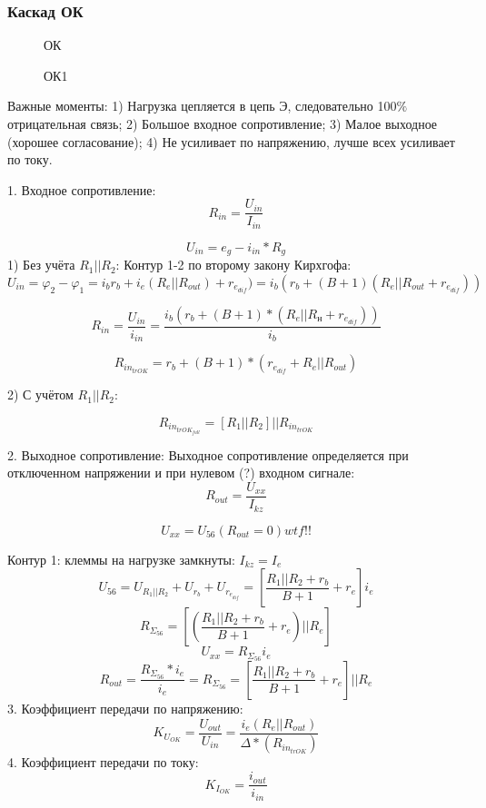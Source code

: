 \subsubsection{Каскад ОК}

\begin{center}
\begin{figure}[h!]
\caption{ОК}
\end{figure}
\end{center}

\begin{center}
\begin{figure}[h!]
\caption{ОК1}
\end{figure}
\end{center}

Важные моменты:
1) Нагрузка цепляется в цепь Э, следовательно 100$\%$ отрицательная связь;
2) Большое входное сопротивление;
3) Малое выходное (хорошее согласование);
4) Не усиливает по напряжению, лучше всех усиливает по току.

1. Входное сопротивление:
$$
R_{in} = \frac{U_{in}}{I_{in}}
$$

$$
U_{in} = e_{g}-i_{in}*R_g
$$
1) Без учёта $R_{1}||R_{2}$:
Контур 1-2 по второму закону Кирхгофа:
$$
U_{in}=\varphi_2 - \varphi_1 = i_br_b + i_e(R_e||R_{out}) + r_{e_{dif}}) = i_{b}(r_{b} + (B+1)(R_{e}||R_{out}+r_{e_{dif}}))
$$

$$
R_{in}=\frac{U_{in}}{i_{in}}=\frac{i_{b}(r_{b} + (B+1)*(R_{e}||R_{н}+r_{e_{dif}}))}{i_{b}}
$$

$$
R_{in_{trOK}}= r_{b} + (B+1)*(r_{e_{dif}}+R_{e}||R_{out})
$$

2) С учётом $R_{1}||R_{2}$:

$$
R_{in_{trOK_{full}}}= [R_{1}||R_{2}]||R_{in_{trOK}}
$$

2. Выходное сопротивление:
Выходное сопротивление определяется при отключенном напряжении и при нулевом (?) входном сигнале:
$$
R_{out}=\frac{U_{xx}}{I_{kz}}
$$

$$
U_{xx}=U_{56}(R_{out}=0) wtf!!
$$

Контур 1: клеммы на нагрузке замкнуты: $ I_{kz}=I_{e} $
$$
U_{56}=U_{R_{1}||R_{2}}+U_{r_{b}}+U_{r_{e_{dif}}} = \left[ \frac{R_{1}||R_{2}+r_{b}}{B+1}+r_{e}\right ]i_{e}
$$
$$
R_{\Sigma_{56}}=\left[\left(\frac{R_{1}||R_{2} + r_{b}}{B+1} + r_{e}\right) || R_{e}\right]
$$
$$
U_{xx}=R_{\Sigma_{56}}i_{e}
$$
$$
R_{out}=\frac{R_{\Sigma_{56}}*i_{e}}{i_{e}}=R_{\Sigma_{56}}=[\frac{R_{1}||R_{2} + r_{b}}{B+1}+r_{e}]||R_{e}
$$
3. Коэффициент передачи по напряжению:
$$
K_{U_{OK}}= \frac{U_{out}}{U_{in}} = \frac{i_e(R_{e}||R_{out})}{\Delta*(R_{in_{trOK}})}
$$
4. Коэффициент передачи по току:
$$
K_{I_{OK}}= \frac{i_{out}}{i_{in}}
$$
\begin{center}
\begin{figure}[h!]
\end{figure}
\end{center}

